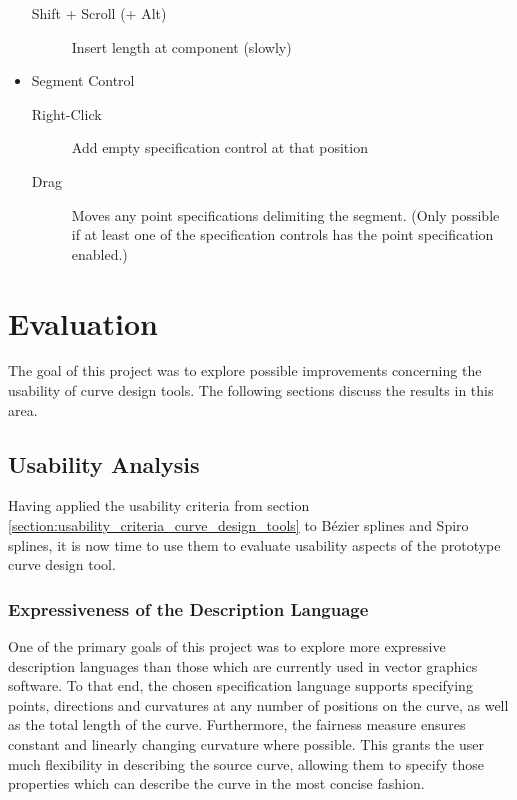 \documentclass[a4paper]{article}
\begin{document}
\begin{itemize}
\begin{description}
							\item[Shift + Scroll (+ Alt)] Insert length at component (slowly)
						\end{description}
						\item Segment Control
						\begin{description}
							\item[Right-Click] Add empty specification control at that position
							\item[Drag] Moves any point specifications delimiting the segment. (Only possible if at least one of the specification controls has the point specification enabled.)
						\end{description}
					\end{itemize}
		
	\section{Evaluation}
	\label{section:evaluation}

		The goal of this project was to explore possible improvements concerning the usability of curve design tools. The following sections discuss the results in this area.

		\subsection{Usability Analysis}
		\label{section:usability_analysis}

			Having applied the usability criteria from section \ref{section:usability_criteria_curve_design_tools} to Bézier splines and Spiro splines, it is now time to use them to evaluate usability aspects of the prototype curve design tool.

			\subsubsection{Expressiveness of the Description Language}
			\label{section:expressiveness_description_language}

				One of the primary goals of this project was to explore more expressive description languages than those which are currently used in vector graphics software. To that end, the chosen specification language supports specifying points, directions and curvatures at any number of positions on the curve, as well as the total length of the curve. Furthermore, the fairness measure ensures constant and linearly changing curvature where possible. This grants the user much flexibility in describing the source curve, allowing them to specify those properties which can describe the curve in the most concise fashion.
\end{document}
